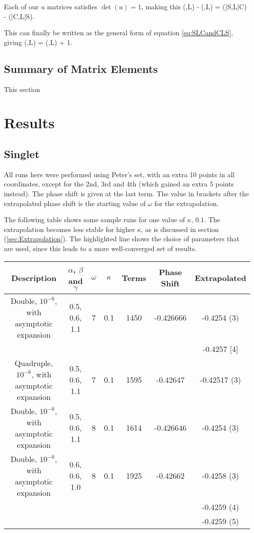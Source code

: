 \documentclass[Dissertation.tex]{subfiles}
\begin{document}
\noindent Each of our $u$ matrices satisfies $\det(u) = 1$, making this
\beq
(,L) - (,L) = (\bar{S},L\bar{C}) - (\bar{C},L\bar{S}).
\eeq

\noindent This can finally be written as the general form of equation \ref{eq:SLCandCLS}, giving
\beq
(,L) = (,L) + 1.
\label{eq:GenSLCandCLS}
\eeq

\subsection{Summary of Matrix Elements}
\label{SWaveMatrixSummary}
This section 



\section{Results}

\subsection{Singlet}
All runs here were performed using Peter's set, with an extra 10 points in all coordinates, except for the 2nd, 3rd and 4th (which gained an extra 5 points instead).  The phase shift is given at the last term.  The value in brackets after the extrapolated phase shift is the starting value of $\omega$ for the extrapolation.

The following table shows some sample runs for one value of $\kappa$, $0.1$.  The extrapolation becomes less stable for higher $\kappa$, as is discussed in section (\ref{sec:Extrapolation}).  The highlighted line shows the choice of parameters that are used, since this leads to a more well-converged set of results.

\begin{center}
\begin{tabular}{|c|c|c|c|c|c|c|}
\hline
Description & $\alpha$, $\beta$ and $\gamma$ & $\omega$ & $\kappa$ & Terms & Phase Shift & Extrapolated\\
\hline
\rowcolor{LightCyan} Double, $10^{-6}$, with asymptotic expansion & 0.5, 0.6, 1.1 & 7 & 0.1 & 1450 & -0.426666 & -0.4254 (3) \\
& & & & & & -0.4257 [4] \\
Quadruple, $10^{-6}$, with asymptotic expansion & 0.5, 0.6, 1.1 & 7 & 0.1 & 1595 & -0.42647 & -0.42517 (3) \\
Double, $10^{-6}$, with asymptotic expansion & 0.5, 0.6, 1.1 & 8 & 0.1 & 1614 & -0.426646 & -0.4254 (3) \\
Double, $10^{-6}$, with asymptotic expansion & 0.6, 0.6, 1.0 & 8 & 0.1 & 1925 & -0.42662 & -0.4258 (3) \\
& & & & & & -0.4259 (4) \\
& & & & & & -0.4259 (5) \\
\hline
\end{tabular}
\end{center}
\end{document}
